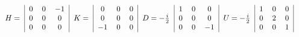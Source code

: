 \begin{equation}\label{MatrixGeneratorsN2B}
\begin{tabular}{c|ccc|c|ccc|c|ccc|c|ccc|c}
    & $0$ &$0$&$-1$& &$0$&0&$0$&                  &$1$&$0$&$0$&                &$1$&$0$&$0$&\\
$H=$&$0$&$0$&$0$&$K=$&$0$&$0$&$0$&$D=-\frac{i}{2}$&$0$&$0$&$0$&$U=-\frac{i}{2}$&$0$&$2$&$0$&\\
    & $0$ &$0$&$0$&  &$-1$&$0$&$0$&               &$0$&$0$&$-1$&               &$0$&$0$&$1$&\\
\end{tabular}\\
\end{equation}


